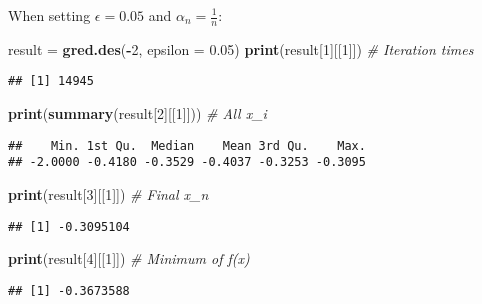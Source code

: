 \documentclass[]{article}
\newenvironment{Shaded}{\begin{snugshade}}{\end{snugshade}}
\newcommand{\KeywordTok}[1]{\textcolor[rgb]{0.13,0.29,0.53}{\textbf{#1}}}
\newcommand{\DataTypeTok}[1]{\textcolor[rgb]{0.13,0.29,0.53}{#1}}
\newcommand{\DecValTok}[1]{\textcolor[rgb]{0.00,0.00,0.81}{#1}}
\newcommand{\FloatTok}[1]{\textcolor[rgb]{0.00,0.00,0.81}{#1}}
\newcommand{\StringTok}[1]{\textcolor[rgb]{0.31,0.60,0.02}{#1}}
\newcommand{\CommentTok}[1]{\textcolor[rgb]{0.56,0.35,0.01}{\textit{#1}}}
\newcommand{\OperatorTok}[1]{\textcolor[rgb]{0.81,0.36,0.00}{\textbf{#1}}}
\newcommand{\NormalTok}[1]{#1}
\begin{document}
When setting \(\epsilon = 0.05\) and \(\alpha_n = \frac{1}{n}\):

\begin{Shaded}
\begin{Highlighting}[]
\NormalTok{result =}\StringTok{ }\KeywordTok{gred.des}\NormalTok{(}\OperatorTok{-}\DecValTok{2}\NormalTok{, }\DataTypeTok{epsilon =} \FloatTok{0.05}\NormalTok{)}
\KeywordTok{print}\NormalTok{(result[}\DecValTok{1}\NormalTok{][[}\DecValTok{1}\NormalTok{]]) }\CommentTok{# Iteration times}
\end{Highlighting}
\end{Shaded}

\begin{verbatim}
## [1] 14945
\end{verbatim}

\begin{Shaded}
\begin{Highlighting}[]
\KeywordTok{print}\NormalTok{(}\KeywordTok{summary}\NormalTok{(result[}\DecValTok{2}\NormalTok{][[}\DecValTok{1}\NormalTok{]])) }\CommentTok{# All x_i}
\end{Highlighting}
\end{Shaded}

\begin{verbatim}
##    Min. 1st Qu.  Median    Mean 3rd Qu.    Max. 
## -2.0000 -0.4180 -0.3529 -0.4037 -0.3253 -0.3095
\end{verbatim}

\begin{Shaded}
\begin{Highlighting}[]
\KeywordTok{print}\NormalTok{(result[}\DecValTok{3}\NormalTok{][[}\DecValTok{1}\NormalTok{]]) }\CommentTok{# Final x_n}
\end{Highlighting}
\end{Shaded}

\begin{verbatim}
## [1] -0.3095104
\end{verbatim}

\begin{Shaded}
\begin{Highlighting}[]
\KeywordTok{print}\NormalTok{(result[}\DecValTok{4}\NormalTok{][[}\DecValTok{1}\NormalTok{]]) }\CommentTok{# Minimum of f(x)}
\end{Highlighting}
\end{Shaded}

\begin{verbatim}
## [1] -0.3673588
\end{verbatim}
\end{document}
